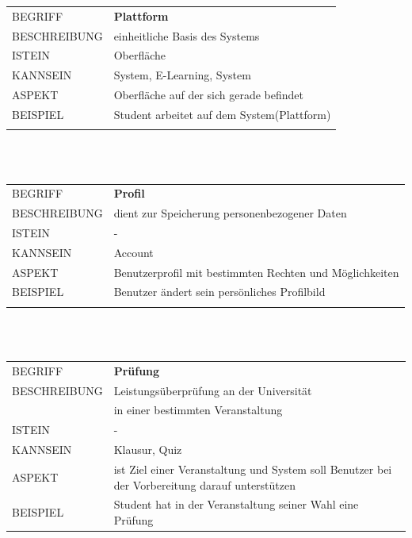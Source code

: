 \documentclass[12pt,a4paper]{article}
\begin{document}
\begin{tabular}{l p{12cm}}
	BEGRIFF 	 & \textbf{Plattform} \\ 
	BESCHREIBUNG & einheitliche Basis des Systems\\ 
	ISTEIN   	 & Oberfläche\\
	KANNSEIN 	 & System, E-Learning, System \\ 
	ASPEKT   	 & Oberfläche auf der sich gerade befindet\\
	BEISPIEL 	 & Student arbeitet auf dem System(Plattform)\\\\
	\hline
\end{tabular}\\\\  

\begin{tabular}{l p{12cm}}
	BEGRIFF 	 & \textbf{Profil} \\ 
	BESCHREIBUNG & dient zur Speicherung personenbezogener Daten \\ 
	ISTEIN   	 & - \\
	KANNSEIN 	 & Account\\ 
	ASPEKT   	 & Benutzerprofil mit bestimmten Rechten und Möglichkeiten\\
	BEISPIEL 	 & Benutzer ändert sein persönliches Profilbild\\\\
	\hline
\end{tabular}\\\\  

\begin{tabular}{l p{12cm}}
	BEGRIFF 	 & \textbf{Prüfung} \\ 
	BESCHREIBUNG & Leistungsüberprüfung an der Universität\\
	& in einer bestimmten Veranstaltung\\ 
	ISTEIN   	 & - \\
	KANNSEIN 	 & Klausur, Quiz\\ 
	ASPEKT   	 & ist Ziel einer Veranstaltung und System soll Benutzer bei der Vorbereitung darauf unterstützen\\
	BEISPIEL 	 & Student hat in der Veranstaltung seiner Wahl eine Prüfung\\
	\hline
\end{tabular}\\\\  
\end{document}
